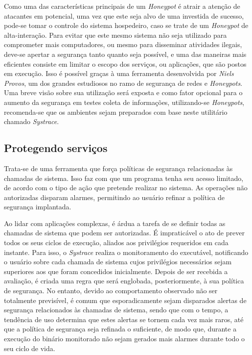 Como uma das características principais de um \textit{Honeypot} é atrair a atenção de atacantes em potencial, uma vez que este seja alvo de uma investida de sucesso, pode-se tomar o controle do sistema hospedeiro, caso se trate de um \textit{Honeypot} de alta-interação. Para evitar que este mesmo sistema não seja utilizado para comprometer mais computadores, ou mesmo para disseminar atividades ilegais, deve-se apertar a segurança tanto quanto seja possível, e uma das maneiras mais eficientes consiste em limitar o escopo dos serviços, ou aplicações, que são postos em execução. Isso é possível graças à uma ferramenta desenvolvida por \textit{Niels Provos}, um dos grandes estudiosos no ramo de segurança de redes e \textit{Honeypots}. Uma breve visão sobre sua utilização será exposta e como fator opcional para o aumento da segurança em testes coleta de informações, utilizando-se \textit{Honeypots}, recomenda-se que os ambientes sejam preparados com base neste utilitário chamado \textit{Systrace}.

\subsection{Protegendo serviços}

Trata-se de uma ferramenta que força políticas de segurança relacionadas às chamadas de sistema\cite{Systrace}. Isso faz com que um programa tenha seu acesso limitado, de acordo com o tipo de ação que pretende realizar no sistema. As operações não autorizadas disparam alarmes, permitindo ao usuário refinar a política de segurança implantada.

Ao lidar com aplicações complexas, é árdua a tarefa de se definir todas as chamadas de sistema que podem ser autorizadas. É impraticável o ato de prever todos os seus ciclos de execução, aliados aos privilégios requeridos em cada instante. Para isso, o \textit{Systrace} \cite{SiteSystrace} realiza o monitoramento do executável, notificando o usuário sobre cada chamada de sistema cujos privilégios necessários sejam superiores aos que foram concedidos inicialmente. Depois de ser recebida a avaliação, é criada uma regra que será englobada, posteriormente, à sua política de segurança. No entanto, devido ao comportamento observado não ser totalmente previsível, é comum que esporadicamente sejam disparados alertas de segurança relacionados às chamadas de sistema, sendo que com o tempo, a tendência de uso determina que estes alertas se tornem cada vez mais raros, até que a política de segurança seja refinada o suficiente, de modo que, durante a execução do binário monitorado não sejam gerados mais alarmes durante todo o seu ciclo de vida.

